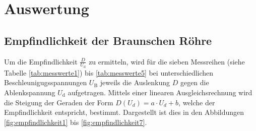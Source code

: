 \section{Auswertung}
\label{sec:Auswertung}

\subsection{Empfindlichkeit der Braunschen Röhre}
Um die Empfindlichkeit $\frac{D}{U_\mathrm{d}}$ zu ermitteln, wird für die sieben Messreihen (siehe Tabelle \ref{tab:messwerte1}) bis \ref{tab:messwerte5} bei unterschiedlichen Beschleunigugsspannungen $U_\mathrm{B}$ jeweils die Auslenkung $D$ gegen die Ablenkspannung $U_\mathrm{d}$ aufgetragen. Mittels einer linearen Ausgleichsrechnung wird die Steigung der Geraden der Form $D(U_d)=a\cdot U_d+b$, welche der Empfindlichkeit entspricht, bestimmt. Dargestellt ist dies in den Abbildungen \ref{fig:empfindlichkeit1} bis \ref{fig:empfindlichkeit7}.

\begin{table}
\centering
  \caption{Messwerte zur Ablenkspannung $U_\mathrm{d}$ und zur Ablenkung $D$ bei verschiedenen Beschleunigungsspannungen $U_\mathrm{B}$.}
  \label{tab:messwerte1}
\end{table}

